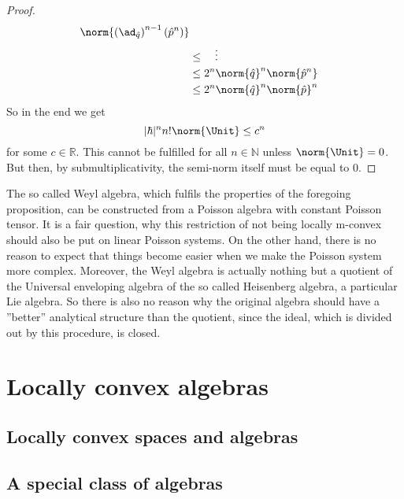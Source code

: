 \begin{proof}
\begin{align*}
		\norm{
			\left( \ad_{\hat{q}} \right)^{n-1}
			(\hat{p}^n)
		}
		\\
		& \leq
		\quad \vdots
		\\
		& \leq
		2^n \norm{\hat{q}}^n
		\norm{ \hat{p}^n }
		\\
		& \leq
		2^n 
		\norm{\hat{q}}^n
		\norm{\hat{p}}^n
	\end{align*}
	So in the end we get
	\begin{equation*}
		|\hbar|^n n! \norm{ \Unit }
		\leq
		c^n
	\end{equation*}
	for some $c \in \mathbb{R}$. This cannot be fulfilled for all 
	$n \in \mathbb{N}$ unless $\norm{ \Unit } = 0$. But then, by
	submultiplicativity, the semi-norm itself must be equal to $0$.
\end{proof}
\begin{remark}
	The so called Weyl algebra, which fulfils the properties of the 
	foregoing proposition, can be constructed from a Poisson algebra with 
	constant Poisson tensor. It is a fair question, why this 
	restriction of not being locally m-convex should also be put on 
	linear Poisson systems. On the other hand, there is no reason to 
	expect that things become easier when we make the Poisson system more 
	complex. Moreover, the Weyl algebra is actually nothing but a 
	quotient of the Universal enveloping algebra of the so called 
	Heisenberg algebra, a particular Lie algebra. So there is also no 
	reason why the original algebra should have a ''better'' analytical 
	structure than the quotient, since the ideal, which is divided out by 
	this procedure, is closed.
\end{remark}
\section{Locally convex algebras}
\label{sec:chap5_LCAlg}


\subsection{Locally convex spaces and algebras}


\subsection{A special class of algebras}


